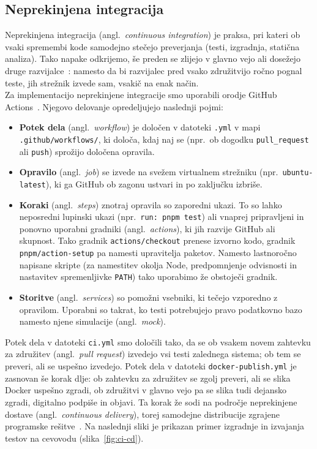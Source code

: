 \documentclass[a4paper,12pt,openright]{book}
\begin{document}
\subsection{Neprekinjena integracija}
\label{subsec:ci}
Neprekinjena integracija (angl.\ \emph{continuous integration}) je praksa,
pri kateri ob vsaki spremembi kode samodejno stečejo preverjanja (testi,
izgradnja, statična analiza). Tako napake odkrijemo, še preden se
zlijejo v glavno vejo ali dosežejo druge razvijalce~\cite{fowler-ci}: namesto da bi
razvijalec pred vsako združitvijo ročno pognal teste, jih strežnik izvede sam,
vsakič na enak način.\\
Za implementacijo neprekinjene integracije smo uporabili orodje GitHub Actions~\cite{github-actions-docs}. Njegovo delovanje opredeljujejo naslednji pojmi:

\begin{itemize}
    \item \textbf{Potek dela} (angl.\ \emph{workflow}) je določen v datoteki \texttt{.yml}
    v mapi \texttt{.github\allowbreak/workflows/}, ki določa, kdaj naj se
    (npr.\ ob dogodku \texttt{pull\_request} ali \texttt{push}) sprožijo določena
    opravila.
    \item \textbf{Opravilo} (angl.\ \emph{job}) se izvede na svežem virtualnem
    strežniku (npr.\ \texttt{ubuntu-latest}), ki ga GitHub ob zagonu ustvari in
    po zaključku izbriše.
    \item \textbf{Koraki} (angl.\ \emph{steps}) znotraj opravila so zaporedni
    ukazi. To so lahko neposredni lupinski ukazi (npr.\ \texttt{run: pnpm test})
    ali vnaprej pripravljeni in ponovno uporabni gradniki (angl.\ \emph{actions}),
    ki jih razvije GitHub ali skupnost. Tako gradnik
    \texttt{actions/checkout} prenese izvorno kodo, gradnik
    \texttt{pnpm/action-setup} pa namesti upravitelja paketov. Namesto
    lastnoročno napisane skripte (za namestitev okolja Node, predpomnjenje
    odvisnosti in nastavitev spremenljivke \texttt{PATH}) tako uporabimo že obstoječi
    gradnik.
    \item \textbf{Storitve} (angl.\ \emph{services}) so pomožni vsebniki, ki
    tečejo vzporedno z opravilom. Uporabni so takrat, ko testi potrebujejo pravo
    podatkovno bazo namesto njene simulacije (angl.\ \emph{mock}).
\end{itemize}

Potek dela v datoteki \texttt{ci.yml} smo določili tako, da se ob
vsakem novem zahtevku za združitev (angl.\ \emph{pull request}) izvedejo vsi testi
zalednega sistema; ob tem se preveri, ali se uspešno izvedejo. Potek dela v datoteki
\texttt{docker-publish.yml} je zasnovan še korak dlje: ob zahtevku za združitev se
zgolj preveri, ali se slika Docker uspešno zgradi, ob združitvi v glavno vejo pa se
slika tudi dejansko zgradi, digitalno podpiše in objavi. Ta korak že sodi na področje
neprekinjene dostave (angl.\ \emph{continuous delivery}), torej samodejne
distribucije zgrajene programske rešitve~\cite{humble-cd}. Na naslednji sliki je prikazan
primer izgradnje in izvajanja testov na cevovodu (slika~\ref{fig:ci-cd}).
\end{document}
